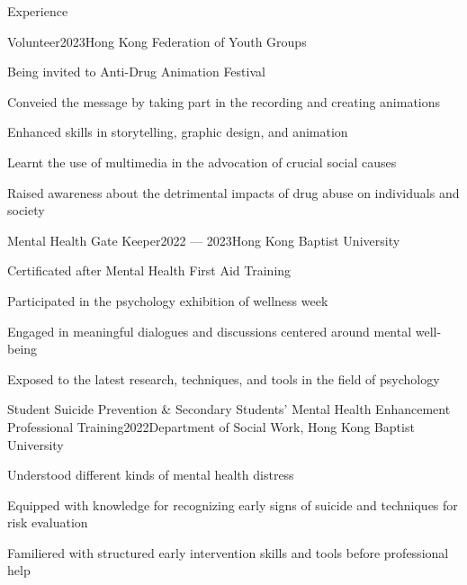 \documentclass[
	11pt, %
]{resume} %
\begin{document}
\begin{rSection}{Experience}


    \begin{rSubsection}{Volunteer}{2023}{Hong Kong Federation of Youth Groups}{}
        \item Being invited to Anti-Drug Animation Festival
        \item Conveied the message by taking part in the recording and creating animations
        \item Enhanced skills in storytelling, graphic design, and animation
        \item Learnt the use of multimedia in the advocation of crucial social causes
        \item Raised awareness about the detrimental impacts of drug abuse on individuals and society
    \end{rSubsection}

    \begin{rSubsection}{Mental Health Gate Keeper}{2022 --- 2023}{Hong Kong Baptist University}{}
        \item Certificated after Mental Health First Aid Training
        \item Participated in the psychology exhibition of wellness week
        \item Engaged in meaningful dialogues and discussions centered around mental well-being
        \item Exposed to the latest research, techniques, and tools in the field of psychology
    \end{rSubsection}

    \begin{rSubsection}{Student Suicide Prevention \& Secondary Students' Mental Health Enhancement Professional Training}{2022}{Department of Social Work, Hong Kong Baptist University}{}
        \item Understood different kinds of mental health distress
        \item Equipped with knowledge  for recognizing early signs of suicide and techniques for risk evaluation
        \item Familiered with structured early intervention skills and tools before professional help
    \end{rSubsection}


\end{rSection}
\end{document}
